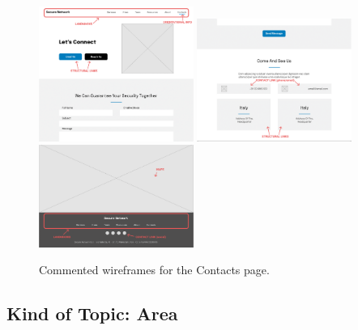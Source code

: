 \documentclass[12pt]{report}
\begin{document}
\begin{figure}[H]
	\centering
	\includegraphics[width=0.45\textwidth]{low_fid_wireframes/contacts/1.png}
	\includegraphics[width=0.45\textwidth]{low_fid_wireframes/contacts/2.png}
	\includegraphics[width=0.45\textwidth]{low_fid_wireframes/contacts/3.png}
	\caption{Commented wireframes for the Contacts page.}
\end{figure}

\subsection{Kind of Topic: Area}
\end{document}
